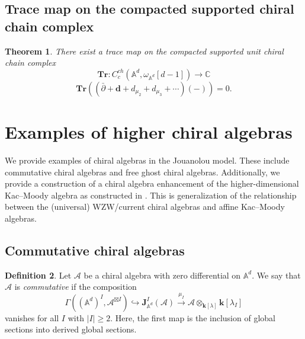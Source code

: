 \documentclass[11pt]{amsart}
\newtheorem{thm}{Theorem}[section]
\theoremstyle{definition}
\newtheorem{defn}[thm]{Definition}
\theoremstyle{remark}
\numberwithin{equation}{section}
\begin{document}
\subsection{Trace map on the compacted supported chiral chain complex}

\begin{thm}
    There exist a trace map on the compacted supported unit chiral chain complex
    $$
    \mathbf{Tr}:C^{ch}_c(\mathbb{A}^d,\omega_{\mathbb{A}^d}[d-1])\rightarrow\mathbb{C}
    $$
    $$
    \mathbf{Tr}\left((\bar{\partial}+\mathbf{d}+d_{\mu_2}+d_{\mu_3}+\cdots)(-)\right)=0.
    $$
\end{thm}

\fi
\section{Examples of higher chiral algebras}

We provide examples of chiral algebras in the Jouanolou model.
These include commutative chiral algebras and free ghost chiral algebras.
Additionally, we provide a construction of a chiral algebra enhancement of the higher-dimensional Kac--Moody algebra as
constructed in \cite{FHK}.
This is generalization of the relationship between the (universal) WZW/current chiral algebras and affine Kac--Moody algebras.

\subsection{Commutative chiral algebras}

\begin{defn}
   Let $\mathcal{A}$ be a chiral algebra with zero differential on $\mathbb{A}^d$. We say that $\mathcal{A}$ is
   \textit{commutative} if the composition
$$
\Gamma\left((\mathbb{A}^d)^{{I}},\mathcal{A}^{\boxtimes {I}}\right)\hookrightarrow \mathbf{J}^{{I}}_{\mathbb{A}^d}(\mathcal{A})\xrightarrow{\mu_{{I}}}\mathcal{A}\otimes_{\mathbf{k}[\lambda]}\mathbf{k}[\lambda_I]
$$
    vanishes for all $I$ with $|I|\geq 2$.
    Here, the first map is the inclusion of global sections into derived global sections.
\end{defn}
\end{document}

